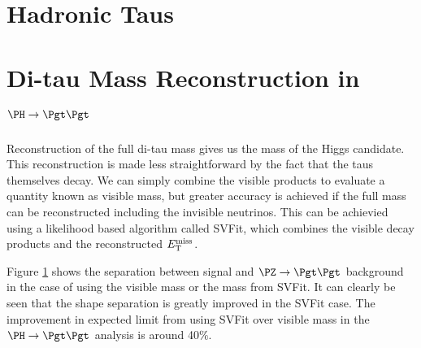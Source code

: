 \section{Hadronic Taus}
\label{sec:taus}

\section{Di-tau Mass Reconstruction in $\PH \to \Pgt\Pgt$}
\label{sec:svfit}

Reconstruction of the full di-tau mass gives us the mass of the Higgs candidate.
This reconstruction is made less straightforward by the fact that the taus
themselves decay. We can simply combine the visible products to evaluate a quantity known as
visible mass, but greater accuracy is achieved if the full mass can be
reconstructed including the invisible neutrinos. This can be achievied
using a likelihood based algorithm called SVFit, which combines the visible decay products 
and the reconstructed $E_{\mathrm{T}}^{\text{miss}}$.

Figure \ref{fig:svfit} shows the separation between signal and $\PZ \to \Pgt\Pgt$
background in the case of using the visible mass or the mass from SVFit. It can
clearly be seen that the shape separation is greatly improved in the SVFit case.
The improvement in expected limit from using SVFit over visible mass in the $\PH
\to \Pgt\Pgt$ analysis is around 40$\%$.


\begin{figure}
\begin{center}
\end{center}
\caption{
}
\label{fig:svfit}
\end{figure}

